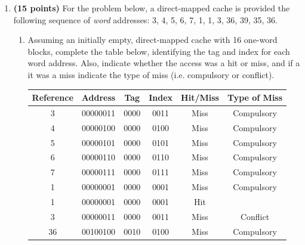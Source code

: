 \documentclass{article}
\begin{document}
\begin{enumerate}
\begin{enumerate}
\begin{figure}[h!]
        \end{figure}
    \end{enumerate}
\newpage\item \textbf{(15 points)} For the problem below, a direct-mapped cache is provided the following sequence of \textit{word} addresses: 3, 4, 5, 6, 7, 1, 1, 3, 36, 39, 35, 36.
\begin{enumerate}
    \item Assuming an initially empty, direct-mapped cache with 16 one-word blocks, complete the table below, identifying the tag and index for each word address. Also, indicate whether the access was a hit or miss, and if a it was a miss indicate the type of miss (i.e. compulsory or conflict).
    \begin{table}[ht]
    \centering
    \bgroup
    \def\arraystretch{1.5}
\begin{tabular}{|c|c|c|c|c|c|}
\hline
\textbf{Reference} & \textbf{Address} & \textbf{Tag} & \textbf{Index} & \textbf{Hit/Miss} & \textbf{Type of Miss} \\ \hline
3                  & 00000011         & 0000         & 0011           & Miss              & Compulsory            \\ \hline
4                  & 00000100         & 0000         & 0100           & Miss              & Compulsory            \\ \hline
5                  & 00000101         & 0000         & 0101           & Miss              & Compulsory            \\ \hline
6                  & 00000110         & 0000         & 0110           & Miss              & Compulsory            \\ \hline
7                  & 00000111         & 0000         & 0111           & Miss              & Compulsory            \\ \hline
1                  & 00000001         & 0000         & 0001           & Miss              & Compulsory            \\ \hline
1                  & 00000001         & 0000         & 0001           & Hit               &                       \\ \hline
3                  & 00000011         & 0000         & 0011           & Miss              & Conflict              \\ \hline
36                 & 00100100         & 0010         & 0100           & Miss              & Compulsory            \\ \hline

\end{tabular}
\end{table}
\end{enumerate}
\end{enumerate}
\end{document}
